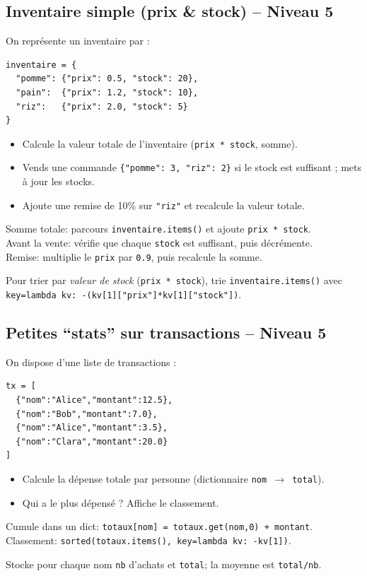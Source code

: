 \documentclass[11pt,a4paper]{article}
\begin{document}
\subsection*{Inventaire simple (prix \& stock) -- Niveau 5}
On représente un inventaire par :
\begin{lstlisting}
inventaire = {
  "pomme": {"prix": 0.5, "stock": 20},
  "pain":  {"prix": 1.2, "stock": 10},
  "riz":   {"prix": 2.0, "stock": 5}
}
\end{lstlisting}
\begin{itemize}
    \item Calcule la valeur totale de l'inventaire (\texttt{prix * stock}, somme).
    \item Vends une commande \texttt{\{"pomme": 3, "riz": 2\}} si le stock est suffisant ; mets à jour les stocks.
    \item Ajoute une remise de 10\% sur \texttt{"riz"} et recalcule la valeur totale.
\end{itemize}
\begin{tcolorbox}[title=Aide]
Somme totale: parcours \texttt{inventaire.items()} et ajoute \texttt{prix * stock}.\\
Avant la vente: vérifie que chaque \texttt{stock} est suffisant, puis décrémente.\\
Remise: multiplie le \texttt{prix} par \texttt{0.9}, puis recalcule la somme.
\end{tcolorbox}
\begin{tcolorbox}[title=Bonus -- Aide]
Pour trier par \emph{valeur de stock} (\texttt{prix * stock}), trie \texttt{inventaire.items()} avec \texttt{key=lambda kv: -(kv[1]["prix"]*kv[1]["stock"])}.
\end{tcolorbox}

\subsection*{Petites ``stats'' sur transactions -- Niveau 5}
On dispose d'une liste de transactions :
\begin{lstlisting}
tx = [
  {"nom":"Alice","montant":12.5},
  {"nom":"Bob","montant":7.0},
  {"nom":"Alice","montant":3.5},
  {"nom":"Clara","montant":20.0}
]
\end{lstlisting}
\begin{itemize}
    \item Calcule la dépense totale par personne (dictionnaire \texttt{nom $\rightarrow$ total}).
    \item Qui a le plus dépensé ? Affiche le classement.
\end{itemize}
\begin{tcolorbox}[title=Aide]
Cumule dans un dict: \texttt{totaux[nom] = totaux.get(nom,0) + montant}.\\
Classement: \texttt{sorted(totaux.items(), key=lambda kv: -kv[1])}.
\end{tcolorbox}
\begin{tcolorbox}[title=Bonus -- Aide]
Stocke pour chaque nom \texttt{nb} d'achats et \texttt{total}; la moyenne est \texttt{total/nb}.
\end{tcolorbox}
\end{document}
